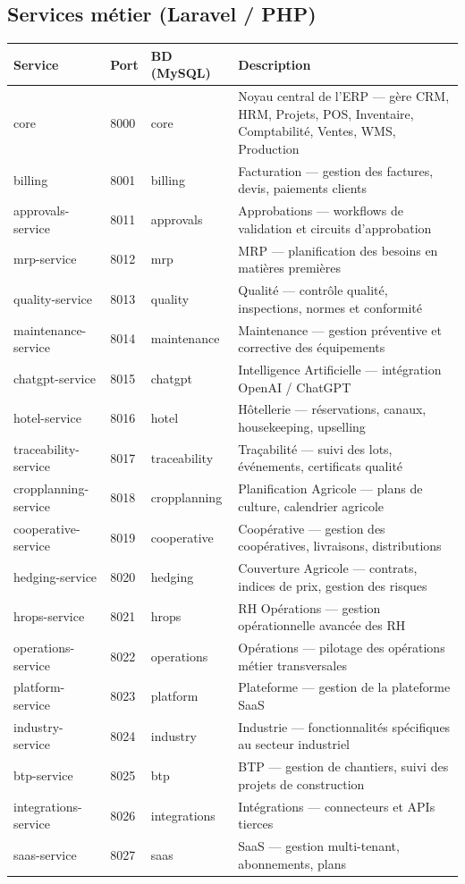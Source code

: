 \documentclass{article}
\begin{document}
\subsection{Services métier (Laravel / PHP)}

\begin{longtable}{p{3.5cm}p{1.2cm}p{2.5cm}p{8cm}}
\toprule
\textbf{Service} & \textbf{Port} & \textbf{BD (MySQL)} & \textbf{Description} \\
\midrule
core & 8000 & core & Noyau central de l'ERP — gère CRM, HRM, Projets, POS, Inventaire, Comptabilité, Ventes, WMS, Production \\
billing & 8001 & billing & Facturation — gestion des factures, devis, paiements clients \\
approvals-service & 8011 & approvals & Approbations — workflows de validation et circuits d'approbation \\
mrp-service & 8012 & mrp & MRP — planification des besoins en matières premières \\
quality-service & 8013 & quality & Qualité — contrôle qualité, inspections, normes et conformité \\
maintenance-service & 8014 & maintenance & Maintenance — gestion préventive et corrective des équipements \\
chatgpt-service & 8015 & chatgpt & Intelligence Artificielle — intégration OpenAI / ChatGPT \\
hotel-service & 8016 & hotel & Hôtellerie — réservations, canaux, housekeeping, upselling \\
traceability-service & 8017 & traceability & Traçabilité — suivi des lots, événements, certificats qualité \\
cropplanning-service & 8018 & cropplanning & Planification Agricole — plans de culture, calendrier agricole \\
cooperative-service & 8019 & cooperative & Coopérative — gestion des coopératives, livraisons, distributions \\
hedging-service & 8020 & hedging & Couverture Agricole — contrats, indices de prix, gestion des risques \\
hrops-service & 8021 & hrops & RH Opérations — gestion opérationnelle avancée des RH \\
operations-service & 8022 & operations & Opérations — pilotage des opérations métier transversales \\
platform-service & 8023 & platform & Plateforme — gestion de la plateforme SaaS \\
industry-service & 8024 & industry & Industrie — fonctionnalités spécifiques au secteur industriel \\
btp-service & 8025 & btp & BTP — gestion de chantiers, suivi des projets de construction \\
integrations-service & 8026 & integrations & Intégrations — connecteurs et APIs tierces \\
saas-service & 8027 & saas & SaaS — gestion multi-tenant, abonnements, plans \\
\bottomrule
\end{longtable}
\end{document}

